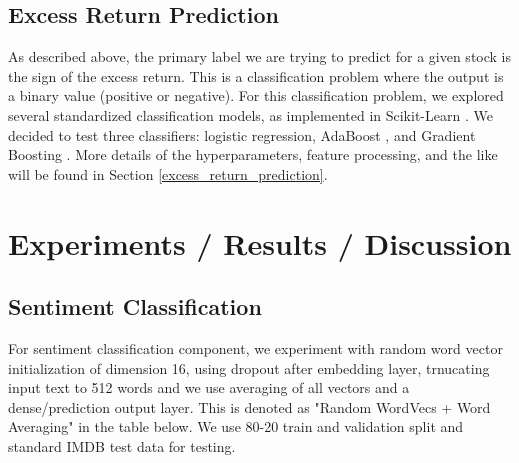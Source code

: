 \documentclass{article}
\newif\ifshowInstructions
\newcommand{\instructions}[1]{%
    \ifshowInstructions%
        \textcolor{violet}{#1}%
    \fi%
}
\begin{document}
\subsection{Excess Return Prediction}
As described above, the primary label we are trying to predict for a given stock is the sign of the excess return.
This is a classification problem where the output is a binary value (positive or negative).
For this classification problem, we explored several standardized classification models, as implemented in Scikit-Learn \citep{scikit-learn}.
We decided to test three classifiers: logistic regression, AdaBoost \citep{10.1007/3-540-59119-2_166}, and Gradient Boosting \citep{4a848dd1-54e3-3c3c-83c3-04977ded2e71}.
More details of the hyperparameters, feature processing, and the like will be found in Section \ref{excess_return_prediction}.

\section{Experiments / Results / Discussion}
\instructions{%
You should also give details about what (hyper)parameters you chose (e.g. why did you use X learning rate for gradient descent, what was your mini-batch size and why) and how you chose them. Did you do cross-validation, if so, how many folds? Before you list your results, make sure to list and explain what your primary metrics are: accuracy, precision, AUC, etc. Provide equations for the metrics if necessary. For results, you want to have a mixture of tables and plots. If you are solving a classification problem, you should include a confusion matrix or AUC/AUPRC curves. Include performance metrics such as precision, recall, and accuracy. For regression problems, state the average error. You should have both quantitative and qualitative results. To reiterate, you must have both quantitative and qualitative results! This includes unsupervised learning (talk with your project TA on how to quantify unsupervised methods). Include visualizations of results, heatmaps, examples of where your algorithm failed and a discussion of why certain algorithms failed or succeeded. In addition, explain whether you think you have overfit to your training set and what, if anything, you did to mitigate that. Make sure to discuss the figures/tables in your main text throughout this section. Your plots should include legends, axis labels, and have font sizes that are legible when printed.
}
\subsection{Sentiment Classification}
For sentiment classification component, we experiment with random word vector initialization
of dimension 16, using dropout after embedding layer, trnucating input text to 512 words and 
we use averaging of all vectors and a dense/prediction output layer. This is denoted
as "Random WordVecs + Word Averaging" in the table below. We use 80-20 train and validation split
and standard IMDB test data for testing.
\end{document}
